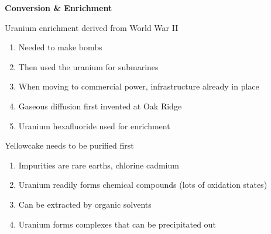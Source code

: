 \documentclass[aspectratio=1610,pdftex,dvipsnames,compress,xcolor={dvipsnames}]{beamer}
\begin{document}
    \centering\LARGE\textbf{Conversion \& Enrichment}


\addtocounter{framenumber}{-1} 
\begin{frame}{Uranium enrichment derived from World War II}
    \begin{enumerate}[topsep=0pt,itemsep=21pt,leftmargin=*,label=(\arabic*)]
        \item[]Needed to make bombs
        \item[]Then used the uranium for submarines 
        \item[]When moving to commercial power, infrastructure already in place
        \item[]Gaseous diffusion first invented at Oak Ridge
        \item[]Uranium hexafluoride used for enrichment
    \end{enumerate}
\end{frame}


\begin{frame}{Yellowcake needs to be purified first}
    \begin{enumerate}[topsep=0pt,itemsep=21pt,leftmargin=*,label=(\arabic*)]
        \item[]Impurities are rare earths, chlorine cadmium
        \item[]Uranium readily forms chemical compounds (lots of oxidation states)
        \item[]Can be extracted by organic solvents
        \item[]Uranium forms complexes that can be precipitated out
    \end{enumerate}
\end{frame}
\end{document}
